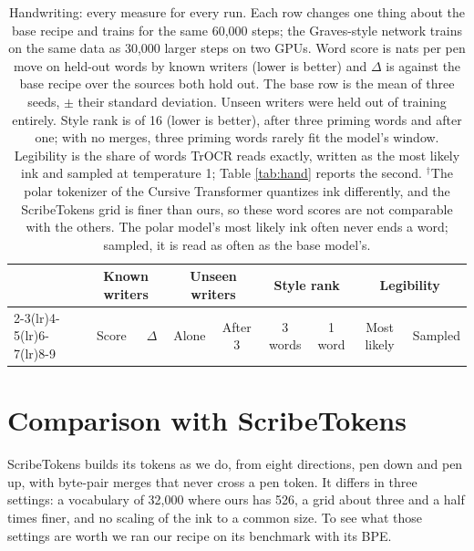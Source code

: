 \documentclass{article}
\begin{document}
\begin{table}[H]
\caption{Handwriting: every measure for every run. Each row changes one thing about the base recipe and trains for the same 60,000 steps; the Graves-style network trains on the same data as 30,000 larger steps on two GPUs. Word score is nats per pen move on held-out words by known writers (lower is better) and $\Delta$ is against the base recipe over the sources both hold out. The base row is the mean of three seeds, $\pm$ their standard deviation. Unseen writers were held out of training entirely. Style rank is of 16 (lower is better), after three priming words and after one; with no merges, three priming words rarely fit the model's window. Legibility is the share of words TrOCR reads exactly, written as the most likely ink and sampled at temperature 1; Table \ref{tab:hand} reports the second. $^\dagger$The polar tokenizer of the Cursive Transformer quantizes ink differently, and the ScribeTokens grid is finer than ours, so these word scores are not comparable with the others. The polar model's most likely ink often never ends a word; sampled, it is read as often as the base model's.}
\label{tab:hand_full}
\vskip 0.1in
\begin{center}
\begin{small}
\setlength{\tabcolsep}{3pt}
\begin{tabular}{lcccccccc}
\toprule
 & \multicolumn{2}{c}{Known writers} & \multicolumn{2}{c}{Unseen writers} & \multicolumn{2}{c}{Style rank} & \multicolumn{2}{c}{Legibility} \\
\cmidrule(lr){2-3}\cmidrule(lr){4-5}\cmidrule(lr){6-7}\cmidrule(lr){8-9}
 & Score & $\Delta$ & Alone & After 3 & 3 words & 1 word & Most likely & Sampled \\
\midrule

\end{tabular}
\end{small}
\end{center}
\vskip -0.1in
\end{table}

\section{Comparison with ScribeTokens}
\label{app:scribetokens}

ScribeTokens \citep{wang2026scribetokens} builds its tokens as we do, from eight directions, pen down and pen up, with byte-pair merges that never cross a pen token. It differs in three settings: a vocabulary of 32,000 where ours has 526, a grid about three and a half times finer, and no scaling of the ink to a common size. To see what those settings are worth we ran our recipe on its benchmark with its BPE.
\end{document}
